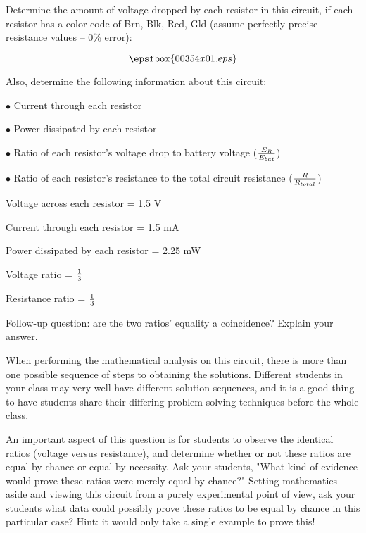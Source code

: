 

Determine the amount of voltage dropped by each resistor in this circuit, if each resistor has a color code of Brn, Blk, Red, Gld (assume perfectly precise resistance values -- 0\% error):

$$\epsfbox{00354x01.eps}$$

Also, determine the following information about this circuit:

\medskip
\item{$\bullet$} Current through each resistor 
\item{$\bullet$} Power dissipated by each resistor
\item{$\bullet$} Ratio of each resistor's voltage drop to battery voltage ($E_R \over E_{bat}$)
\item{$\bullet$} Ratio of each resistor's resistance to the total circuit resistance ($R \over R_{total}$)
\medskip







Voltage across each resistor = 1.5 V

Current through each resistor = 1.5 mA

Power dissipated by each resistor = 2.25 mW

Voltage ratio = $1 \over 3$

Resistance ratio = $1 \over 3$

\vskip 10pt

Follow-up question: are the two ratios' equality a coincidence?  Explain your answer.







When performing the mathematical analysis on this circuit, there is more than one possible sequence of steps to obtaining the solutions.  Different students in your class may very well have different solution sequences, and it is a good thing to have students share their differing problem-solving techniques before the whole class.

An important aspect of this question is for students to observe the identical ratios (voltage versus resistance), and determine whether or not these ratios are equal by chance or equal by necessity.  Ask your students, "What kind of evidence would prove these ratios were merely equal by chance?"  Setting mathematics aside and viewing this circuit from a purely experimental point of view, ask your students what data could possibly prove these ratios to be equal by chance in this particular case?  Hint: it would only take a single example to prove this!




